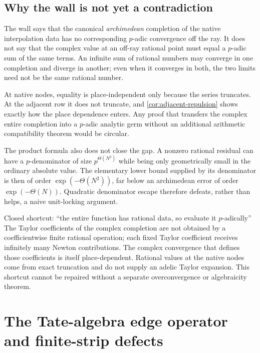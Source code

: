 \documentclass[11pt,oneside]{article}
\theoremstyle{definition}
\begin{document}
\subsection{Why the wall is not yet a contradiction}

The wall says that the canonical \emph{archimedean} completion of the native interpolation
data has no corresponding $p$-adic convergence off the ray.  It does not say that the
complex value at an off-ray rational point must equal a $p$-adic sum of the same terms.  An
infinite sum of rational numbers may converge in one completion and diverge in another; even
when it converges in both, the two limits need not be the same rational number.

At native nodes, equality is place-independent only because the series truncates.  At the
adjacent row it does not truncate, and \cref{cor:adjacent-repulsion} shows exactly how the
place dependence enters.  Any proof that transfers the complex entire completion into a
$p$-adic analytic germ without an additional arithmetic compatibility theorem would be
circular.

The product formula also does not close the gap.  A nonzero rational residual can have a
$p$-denominator of size $p^{\Theta(N^2)}$ while being only geometrically small in the
ordinary absolute value.  The elementary lower bound supplied by its denominator is then of
order $\exp(-\Theta(N^2))$, far below an archimedean error of order $\exp(-\Theta(N))$.
Quadratic denominator escape therefore defeats, rather than helps, a naive unit-locking
argument.

\begin{deadbox}{Closed shortcut: ``the entire function has rational data, so evaluate it $p$-adically''}
The Taylor coefficients of the complex completion are not obtained by a coefficientwise
finite rational operation; each fixed Taylor coefficient receives infinitely many Newton
contributions.  The complex convergence that defines those coefficients is itself
place-dependent.  Rational values at the native nodes come from exact truncation and do not
supply an adelic Taylor expansion.  This shortcut cannot be repaired without a separate
overconvergence or algebraicity theorem.
\end{deadbox}

\section{The Tate-algebra edge operator and finite-strip defects}
\label{sec:tate-edge}
\end{document}
